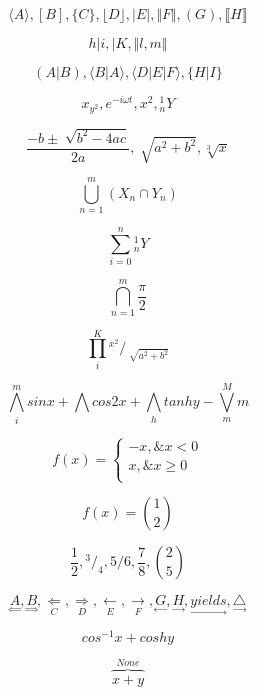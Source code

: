 \documentclass{book}
\begin{document}
$$\langle A\rangle , [B], \lbrace C\rbrace , \lfloor D\rfloor , \vert E\vert , \Vert F\Vert , (G), \llbracket H\rrbracket $$

$$h\vert i, \vert K, \Vert l, m\Vert $$

$$(A\vert B),\langle B\vert A\rangle ,\langle D\vert E\vert F\rangle , \lbrace H\vert I\rbrace $$

$${x}_{{y}^{2}}, {e}^{-i\omega t},{x}^{2},{^1_n}Y$$

$$\frac{-b\pm \sqrt[]{{b}^{2}-4ac}}{2a}, \sqrt[]{{a}^{2}+{b}^{2}}, \sqrt[3]{x}$$

$$\bigcup _{n=1}^{m} ({X}_{n}\cap {Y}_{n})$$

$$\sum _{i=0}^{n} {^1_n}Y$$

$$\bigcap _{n=1}^{m} \frac{\pi }{2}$$

$$\prod _{i}^{K} {^{{x}^{2}}}/_{\sqrt[]{{a}^{2}+{b}^{2}}}$$

$$\bigwedge_{i}^{m} sinx+\bigwedge_{}^{} cos2x+\bigwedge_{h}^{} tanhy-\bigvee_{m}^{M} m$$

$$f(x)=\left \{ \begin{array}{lr}
-x,  \& x<0 \\
x,  \& x\geq 0 \\
\end{array} \right.$$

$$f(x)={1 \choose 2}$$

$$\frac{1}{2}, {^{3}}/_{4}, {5}/{6},\frac{7}{8}, {2 \choose 5}$$

$$\underset{\Leftarrow }{A}, \underset{\Rightarrow }{B}, \underset{C}{\Leftarrow }, \underset{D}{\Rightarrow }, \underset{E}{\leftarrow }, \underset{F}{\rightarrow },\underset{\leftarrow }{G}, \underset{\rightarrow }{H}, \underset{\rightarrow }{yields}, \underset{\rightarrow }{\triangle}$$

$${cos}^{-1}x+coshy$$

$$\overset{None}{\overbrace{x+y}}$$
\end{document}
